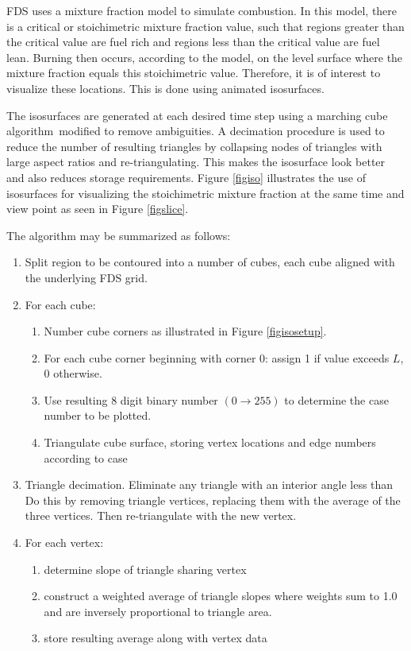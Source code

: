 \documentclass[11pt,twoside]{book}
\begin{document}
FDS uses a mixture fraction model to simulate
combustion. In this model, there is a critical or stoichimetric
mixture fraction value, such that regions greater than the
critical value are fuel rich and regions less than the critical
value are fuel lean. Burning then occurs, according to the model,
on the level surface where the mixture fraction equals this
stoichimetric value. Therefore, it is of interest to visualize
these locations. This is done using animated isosurfaces.

The isosurfaces are generated at each desired time step using a
marching cube algorithm\cite{marchingcubes}\ modified to remove
ambiguities. A decimation procedure is used to reduce the number
of resulting triangles by collapsing nodes of triangles with large
aspect ratios and re-triangulating. This makes the isosurface look
better and also reduces storage requirements. Figure \ref{figiso}
illustrates the use of isosurfaces for visualizing the
stoichimetric mixture fraction at the same time and view point as
seen in Figure \ref{figslice}.

The algorithm may be summarized as follows:
\begin{enumerate}
\item Split region to be contoured into a number of cubes, each cube aligned with the underlying FDS grid.
\item For  each cube:
\begin{enumerate}
\item Number cube corners as illustrated in Figure \ref{figisosetup}.
\item For each cube corner beginning with corner 0: assign 1 if value exceeds $L$, 0 otherwise.
\item Use resulting 8 digit binary number $(0\rightarrow 255)$ to determine the case number to be plotted.
\item Triangulate cube surface, storing vertex locations and edge numbers according to case
\end{enumerate}
\item Triangle decimation.  Eliminate any triangle with an interior angle less than     %
Do this by removing triangle vertices, replacing them with the average of the three vertices.  Then re-triangulate with the new vertex.
\item For each vertex:
\begin{enumerate}
\item determine slope of triangle sharing vertex
\item construct a weighted average of triangle slopes where weights sum to 1.0 and are inversely proportional to triangle area.
\item store resulting average along with vertex data
\end{enumerate}
\end{enumerate}
\end{document}
